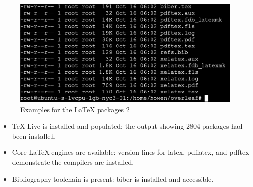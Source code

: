 \begin{figure} [H]
\includegraphics[width=\textwidth]{png/proof2.png}
  \centering
  \caption{Examples for the LaTeX packages 2}
  \vspace{-0.3cm}
\end{figure}


\begin{itemize}
  \item TeX Live is installed and populated: the output showing 2804 packages had been installed.
  \item Core LaTeX engines are available: version lines for latex, pdflatex, and pdftex demonstrate the compilers are installed.
  \item Bibliography toolchain is present: biber is installed and accessible.
\end{itemize}



